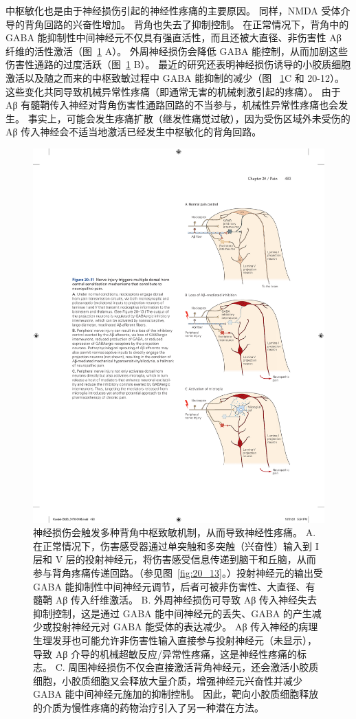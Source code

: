 中枢敏化也是由于神经损伤引起的神经性疼痛的主要原因。
同样，NMDA 受体介导的背角回路的兴奋性增加。
背角也失去了抑制控制。
在正常情况下，背角中的 GABA 能抑制性中间神经元不仅具有强直活性，而且还被大直径、非伤害性 Aβ 纤维的活性激活（图~\ref{fig:20_11} A）。
外周神经损伤会降低 GABA 能控制，从而加剧这些伤害性通路的过度活跃（图~\ref{fig:20_11} B）。
最近的研究还表明神经损伤诱导的小胶质细胞激活以及随之而来的中枢致敏过程中 GABA 能抑制的减少（图 ~\ref{fig:20_11}C 和 20-12）。
这些变化共同导致机械异常性疼痛（即通常无害的机械刺激引起的疼痛）。
由于 Aβ 有髓鞘传入神经对背角伤害性通路回路的不当参与，机械性异常性疼痛也会发生。
事实上，可能会发生疼痛扩散（继发性痛觉过敏），因为受伤区域外未受伤的 Aβ 传入神经会不适当地激活已经发生中枢敏化的背角回路。


\begin{figure}[htbp]
	\centering
	\includegraphics[width=0.5\linewidth]{chap20/fig_20_11}
	\caption{神经损伤会触发多种背角中枢致敏机制，从而导致神经性疼痛。
		A. 在正常情况下，伤害感受器通过单突触和多突触（兴奋性）输入到 I 层和 V 层的投射神经元，将伤害感受信息传递到脑干和丘脑，从而参与背角疼痛传递回路。（参见图~\ref{fig:20_13}。）投射神经元的输出受 GABA 能抑制性中间神经元调节，后者可被非伤害性、大直径、有髓鞘 Aβ 传入纤维激活。
		B. 外周神经损伤可导致 Aβ 传入神经失去抑制控制，这是通过 GABA 能中间神经元的丢失、GABA 的产生减少或投射神经元对 GABA 能受体的表达减少。
		Aβ 传入神经的病理生理发芽也可能允许非伤害性输入直接参与投射神经元（未显示），导致 Aβ 介导的机械超敏反应/异常性疼痛，这是神经性疼痛的标志。
		C. 周围神经损伤不仅会直接激活背角神经元，还会激活小胶质细胞，小胶质细胞又会释放大量介质，增强神经元兴奋性并减少 GABA 能中间神经元施加的抑制控制。
		因此，靶向小胶质细胞释放的介质为慢性疼痛的药物治疗引入了另一种潜在方法。}
	\label{fig:20_11}
\end{figure}



